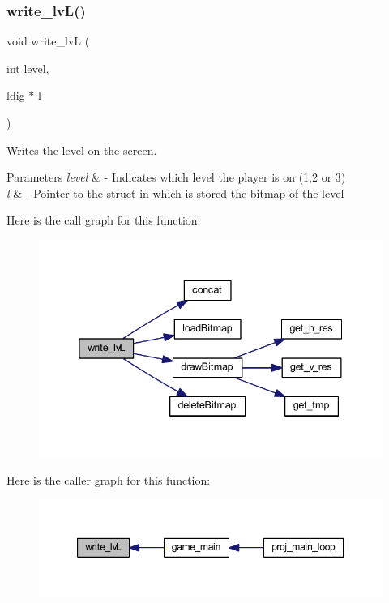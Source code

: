 \subsubsection{\texorpdfstring{write\+\_\+lv\+L()}{write\_lvL()}}
{\footnotesize\ttfamily void write\+\_\+lvL (\begin{DoxyParamCaption}\item[{int}]{level,  }\item[{\mbox{\hyperlink{structldig}{ldig}} $\ast$}]{l }\end{DoxyParamCaption})}



Writes the level on the screen. 


\begin{DoxyParams}{Parameters}
{\em level} & -\/ Indicates which level the player is on (1,2 or 3) \\
\hline
{\em l} & -\/ Pointer to the struct in which is stored the bitmap of the level \\
\hline
\end{DoxyParams}
Here is the call graph for this function\+:
\nopagebreak
\begin{figure}[H]
\begin{center}
\leavevmode
\includegraphics[width=338pt]{group__game_gaf426df873300d051272115729c8fa5a1_cgraph}
\end{center}
\end{figure}
Here is the caller graph for this function\+:
\nopagebreak
\begin{figure}[H]
\begin{center}
\leavevmode
\includegraphics[width=350pt]{group__game_gaf426df873300d051272115729c8fa5a1_icgraph}
\end{center}
\end{figure}
\mbox{\label{group__game_ga4447b1a565fed3c6130bf9e38970b933}} 
